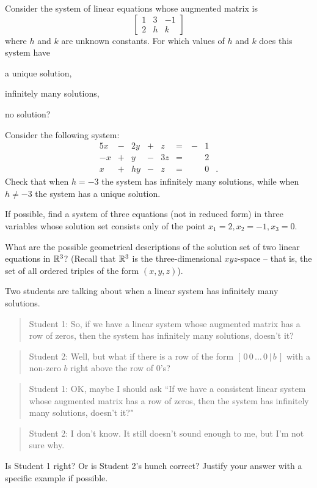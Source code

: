 \label{sec:mtx_sys_exer}

\be
\item Consider the system of linear equations whose augmented matrix is
\[ \left[ \begin{array}{cc|r} 1 & 3 & -1 \\ 2& h & k \end{array} \right] \]
where $h$ and $k$ are unknown constants. For which values of $h$ and $k$ does this system have 
	\ba
	\item a unique solution, 
	\item infinitely many solutions, 
	\item no solution? 
	\ea

\item Consider the following system:
\begin{alignat*}{5}
{}x 	&{}-{}	&{2}y	&{}+{}	&{}z		&{}={}	&\ {-}&1&{}\\
{-}x	&{}+{}	&{}y		&{}-{}	&{3}z	&{}={} &\ {}&2&{} \\
{}x	&{}+{}	&{h}y	&{}-{}	&{}z		&{}={}	& \ {}&0&{.}
\end{alignat*}
Check that when $h=-3$ the system has infinitely many solutions, while when $h\neq -3$ the system has a unique solution.


\item If possible, find a system of three equations (not in reduced form) in three variables whose solution set consists only of the point $x_1=2, x_2=-1, x_3=0$.

\item What are the possible geometrical descriptions of the solution set of two linear equations in $\mathbb{R}^3$? (Recall that $\mathbb{R}^3$ is the three-dimensional $xyz$-space -- that is, the set of all ordered triples of the form $(x,y,z)$).

\item Two students are talking about when a linear system has infinitely many solutions. 
\begin{quote}
Student 1: So, if we have a linear system whose augmented matrix has a row of zeros, then the system has infinitely many solutions, doesn't it?
\end{quote} 
\begin{quote}
Student 2: Well, but what if there is a row of the form $[\, 0\, 0\, \ldots\, 0\, |\, b\, ]$ with a non-zero $b$ right above the row of 0's?
\end{quote} 
\begin{quote}
Student 1: OK, maybe I should ask ``If we have a consistent linear system whose augmented matrix has a row of zeros, then the system has infinitely many solutions, doesn't it?"
\end{quote} 
\begin{quote}
Student 2: I don't know. It still doesn't sound enough to me, but I'm not sure why.
\end{quote}
Is Student 1 right? Or is Student 2's hunch correct? Justify your answer with a specific example if possible.

